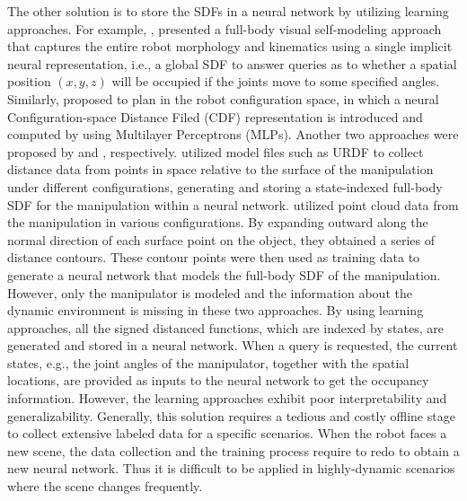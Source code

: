 The other solution is to store the SDFs in a neural network by utilizing learning approaches. For example, \cite{2024_ICRA_dynamic_neural_fields_for_robot_self-modeling}, \cite{2022_SR_Fully_body_visual_self_modeling} presented a full-body visual self-modeling approach that captures the entire robot morphology and kinematics using a single implicit neural representation, i.e., a global SDF to answer queries as to whether a spatial position $\left(x, y, z\right)$ will be occupied if the joints move to some specified angles. Similarly, \cite{2024_arxiv_CDF} proposed to plan in the robot configuration space, in which a neural Configuration-space Distance Filed (CDF) representation is introduced and computed by using Multilayer Perceptrons (MLPs).
Another two approaches were proposed by \cite{2022_RAL_Neural_joint_space_implicit} and \cite{2022_RSJ_Regularized_deep_signed_distance_fields}, respectively. \cite{2022_RAL_Neural_joint_space_implicit} utilized model files such as URDF to collect distance data from points in space relative to the surface of the manipulation under different configurations, generating and storing a state-indexed full-body SDF for the manipulation within a neural network. \cite{2022_RSJ_Regularized_deep_signed_distance_fields} utilized point cloud data from the manipulation in various configurations. By expanding outward along the normal direction of each surface point on the object, they obtained a series of distance contours. These contour points were then used as training data to generate a neural network that models the full-body SDF of the manipulation. However, only the manipulator is modeled and the information about the dynamic environment is missing in these two approaches.
By using learning approaches, all the signed distanced functions, which are indexed by states, are generated and stored in a neural network. When a query is requested, the current states, e.g., the joint angles of the manipulator, together with the spatial locations, are provided as inputs to the neural network to get the occupancy information.
However, the learning approaches exhibit poor interpretability and generalizability. Generally, this solution requires a tedious and costly offline stage to collect extensive labeled data for a specific scenarios. When the robot faces a new scene, the data collection and the training process require to redo to obtain a new neural network. Thus it is difficult to be applied in highly-dynamic scenarios where the scene changes frequently.